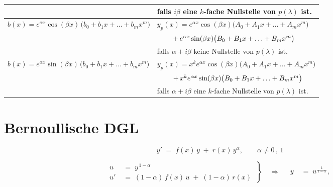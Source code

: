 \documentclass[a4paper,11pt,oneside,open=any,parskip=half, DIV=15]{scrreprt}
\begin{document}
\begin{importantbox}
\begin{center}
\begin{tabular}{|p{}|p{}|}
            & falls \(i\beta\) eine \(k\)-fache Nullstelle von \(p(\lambda)\) ist.\\
            \hline   %
            \(b(x)= e^{\alpha x}\cos(\beta x)\,\big(b_0 + b_1 x + \ldots + b_m x^m\big)\) %
            &
            \(y_p(x)= e^{\alpha x}\cos(\beta x)\big(A_0 + A_1 x + \ldots + A_m x^m\big)\)\\  %
            & \(\hspace{2.2em}+\, e^{\alpha x}\sin(\beta x)\big(B_0 + B_1 x + \ldots + B_m x^m\big)\)\\  %
            & falls \(\alpha+i\beta\) keine Nullstelle von \(p(\lambda)\) ist.\\
            \(b(x)= e^{\alpha x}\sin(\beta x)\,\big(b_0 + b_1 x + \ldots + b_m x^m\big)\) %
            &
            \(y_p(x)= x^{k} e^{\alpha x}\cos(\beta x)\big(A_0 + A_1 x + \ldots + A_m x^m\big)\)\\  %
            & \(\hspace{2.2em}+\, x^{k} e^{\alpha x}\sin(\beta x)\big(B_0 + B_1 x + \ldots + B_m x^m\big)\)\\  %
            & falls \(\alpha+i\beta\) eine \(k\)-fache Nullstelle von \(p(\lambda)\) ist.\\
            \hline   %
         \end{tabular}
      \end{center}
   \end{importantbox}

\newpage

   \section{Bernoullische DGL}

      \begin{importantbox}
         \[
            y' \;=\; f(x)\,y \;+\; r(x)\,y^{\alpha}, \qquad \alpha\neq 0 \, , \, 1
         \]
      \end{importantbox}

      \[
         \left.
         \begin{aligned}
            u \;&=\; y^{\,1-\alpha}\\[1em]
            u' \;&=\; (1-\alpha)\,f(x)\,u \;+\; (1-\alpha)\,r(x)
         \end{aligned}
         \ \right\}
         \quad\Longrightarrow\quad
         \begin{aligned}
            y \;&=\; u^{\frac{1}{\,1-\alpha\,}},\\[2pt]
         \end{aligned}
      \]
\end{document}
